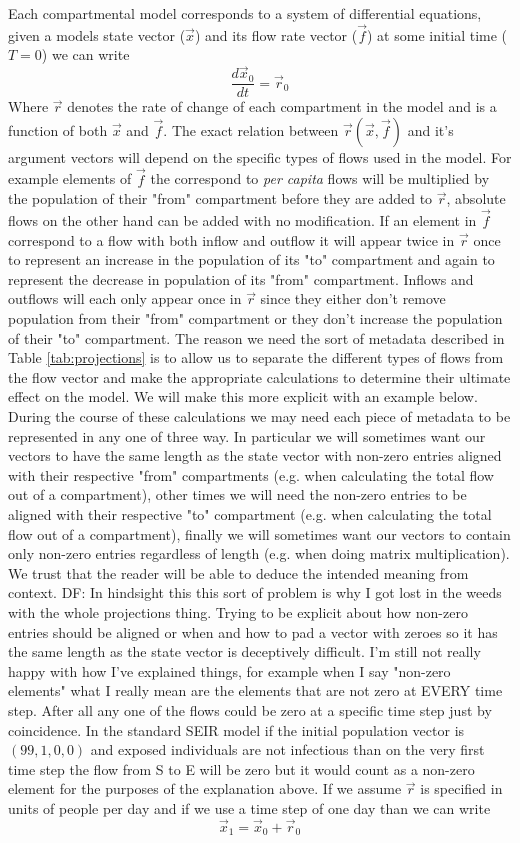 \documentclass[pdflatex,sn-basic]{sn-jnl}%
\theoremstyle{definition}
\newcommand{\df}[1]{{\color{orange} DF: #1}}
\newcommand{\xvec}{\vec{x}}
\newcommand{\fvec}{\vec{f}}
\newcommand{\rvec}{\vec{r}}
\begin{document}
Each compartmental model corresponds to a system of differential equations, given a models state vector ($\xvec$) and its flow rate vector ($\fvec$) at some initial time ($T=0$) we can write
\[
    \frac{d\xvec_0}{dt} = \rvec_0
\]
Where $\rvec$ denotes the rate of change of each compartment in the model and is a function of both $\xvec$ and $\fvec$. The exact relation between $\rvec(\xvec, \fvec)$ and it's argument vectors will depend on the specific types of flows used in the model. For example elements of $\fvec$ the correspond to \emph{per capita} flows will be multiplied by the population of their "from" compartment before they are added to $\rvec$, absolute flows on the other hand can be added with no modification. If an element in $\fvec$ correspond to a flow with both inflow and outflow it will appear twice in $\rvec$ once to represent an increase in the population of its "to" compartment and again to represent the decrease in population of its "from" compartment. Inflows and outflows will each only appear once in $\rvec$ since they either don't remove population from their "from" compartment or they don't increase the population of their "to" compartment. The reason we need the sort of metadata described in Table \ref{tab:projections} is to allow us to separate the different types of flows from the flow vector and make the appropriate calculations to determine their ultimate effect on the model. We will make this more explicit with an example below. During the course of these calculations we may need each piece of metadata to be represented in any one of three way. In particular we will sometimes want our vectors to have the same length as the state vector with non-zero entries aligned with their respective "from" compartments (e.g. when calculating the total flow out of a compartment), other times we will need the non-zero entries to be aligned with their respective "to" compartment (e.g. when calculating the total flow out of a compartment), finally we will sometimes want our vectors to contain only non-zero entries regardless of length (e.g. when doing matrix multiplication). We trust that the reader will be able to deduce the intended meaning from context. \df{In hindsight this this sort of problem is why I got lost in the weeds with the whole projections thing. Trying to be explicit about how non-zero entries should be aligned or when and how to pad a vector with zeroes so it has the same length as the state vector is deceptively difficult. I'm still not really happy with how I've explained things, for example when I say "non-zero elements" what I really mean are the elements that are not zero at EVERY time step. After all any one of the flows could be zero at a specific time step just by coincidence. In the standard SEIR model if the initial population vector is $(99,1,0,0)$ and exposed individuals are not infectious than on the very first time step the flow from S to E will be zero but it would count as a non-zero element for the purposes of the explanation above.} If we assume $\rvec$ is specified in units of people per day and if we use a time step of one day than we can write
\[
    \xvec_1 = \xvec_0 + \rvec_0
\]
\end{document}
